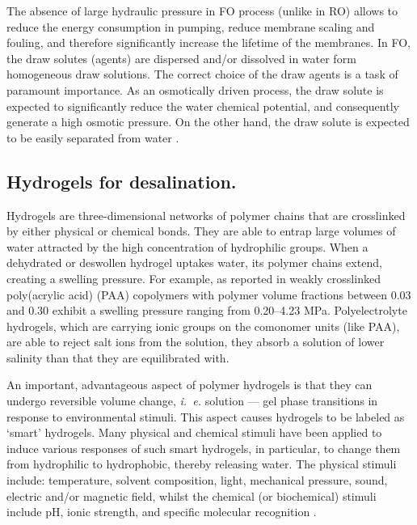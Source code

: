 \documentclass[journal,article,submit,pdftex,moreauthors]{Definitions/mdpi}
\newcommand{\ie}{\textit{i.~e.} }
\begin{document}
The absence of large hydraulic pressure in FO process (unlike in RO) allows to reduce the energy consumption in pumping, reduce membrane scaling and fouling, and therefore significantly increase the lifetime of the membranes. 
In FO, the draw solutes (agents) are dispersed and/or dissolved in water form homogeneous draw solutions. 
The correct choice of the draw agents is a task of paramount importance. 
As an osmotically driven process, the draw solute is expected to significantly reduce the water chemical potential, and consequently generate a high osmotic pressure. 
On the other hand, the draw solute is expected to be easily separated from water \cite{Cai2016}.

\subsection{Hydrogels for desalination.}
Hydrogels are three-dimensional networks of polymer chains that are crosslinked by either physical or chemical bonds. 
They are able to entrap large volumes of water attracted by the high concentration of hydrophilic groups. 
When a dehydrated or deswollen hydrogel uptakes water, its polymer chains extend, creating a swelling pressure. 
For example, as reported in \cite{Wack_2009} weakly crosslinked poly(acrylic acid) (PAA) copolymers with polymer volume fractions between 0.03 and 0.30 exhibit a swelling pressure ranging from 0.20--4.23 MPa.
Polyelectrolyte hydrogels, which are carrying ionic groups on the comonomer units (like PAA), are able to reject salt ions from the solution, they absorb a solution of lower salinity than that they are equilibrated with. 

An important, advantageous aspect of polymer hydrogels is that they can undergo reversible volume change, \ie solution --- gel phase transitions in response to environmental stimuli. 
This aspect causes hydrogels to be labeled as ‘smart’ hydrogels. 
Many physical and chemical stimuli have been applied to induce various responses of such smart hydrogels, in particular, to change them from hydrophilic to hydrophobic, thereby releasing water. 
The physical stimuli include: temperature, solvent composition, light, mechanical pressure, sound, electric and/or magnetic field, whilst the chemical (or biochemical) stimuli include pH, ionic strength, and specific molecular recognition \cite{Tanaka_1982,Serizawa_2001,Lietor_Santos_2009,Qiu_2001}.
\end{document}

